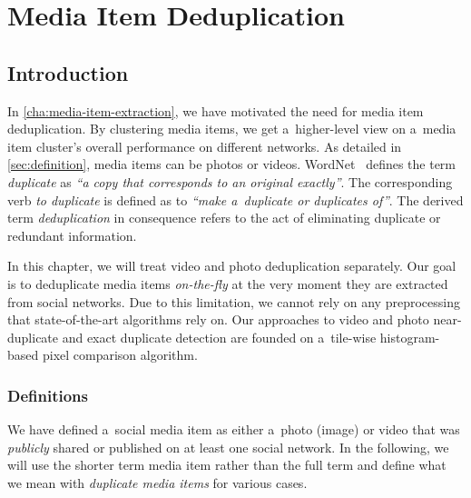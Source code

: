 \chapter{Media Item Deduplication}
\label{cha:media-item-deduplication}

\ifpdf
    \graphicspath{{7_media_item_deduplication/figures/PNG/}{7_media_item_deduplication/figures/PDF/}{7_media_item_deduplication/figures/}}
\else
    \graphicspath{{7_media_item_deduplication/figures/EPS/}{7_media_item_deduplication/figures/}}
\fi

\section{Introduction}

In \autoref{cha:media-item-extraction},
we have motivated the need for media item deduplication.
By clustering media items, we get a~higher-level view on
a~media item cluster's overall performance on different networks.
As detailed in \autoref{sec:definition}, media items can be
photos or videos.
WordNet~\cite{fellbaum1998wordnet,miller1995wordnet} defines
the term \emph{duplicate} as
\textit{``a copy that corresponds to an original exactly''}.
The corresponding verb \emph{to duplicate} is defined as to
\textit{``make a~duplicate or duplicates of''}.
The derived term \emph{deduplication} in consequence refers to
the act of eliminating duplicate or redundant information.

In this chapter, we will treat video
and photo deduplication separately. 
Our goal is to deduplicate media items \emph{on-the-fly}
at the very moment they are extracted from social networks.
Due to this limitation, we cannot rely on any preprocessing
that state-of-the-art algorithms rely on.
Our approaches to video and photo near-duplicate
and exact duplicate detection are founded
on a~tile-wise histogram-based pixel comparison algorithm.

\subsection{Definitions}

We have defined a~social media item as either a~photo (image) or video
that was \emph{publicly} shared or published
on at least one social network.
In the following, we will use the shorter term media item
rather than the full term and define
what we mean with \emph{duplicate media items} for various cases.

